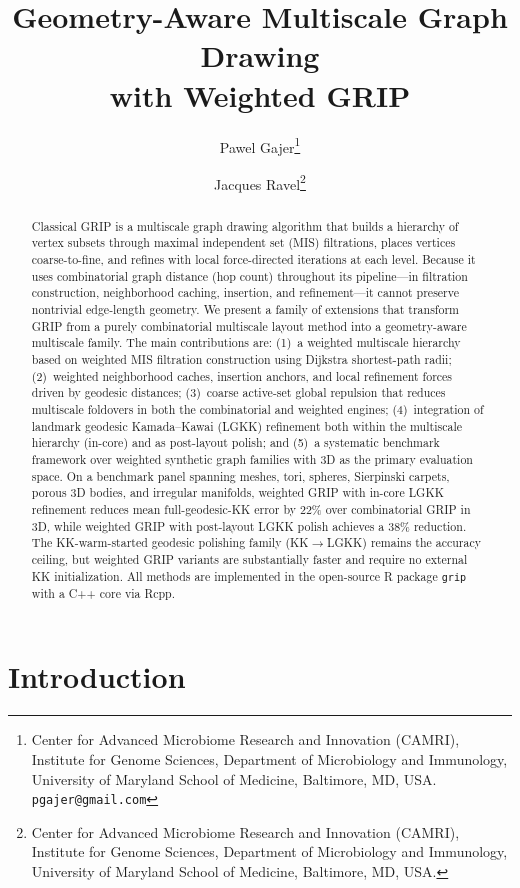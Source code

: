 \documentclass[11pt,twocolumn]{article}
\title{Geometry-Aware Multiscale Graph Drawing\\with Weighted GRIP}
\author{
  Pawel Gajer\thanks{Center for Advanced Microbiome Research and Innovation
  (CAMRI), Institute for Genome Sciences, Department of Microbiology and
  Immunology, University of Maryland School of Medicine, Baltimore, MD, USA.
  \texttt{pgajer@gmail.com}}
  \and
  Jacques Ravel\thanks{Center for Advanced Microbiome Research and Innovation
  (CAMRI), Institute for Genome Sciences, Department of Microbiology and
  Immunology, University of Maryland School of Medicine, Baltimore, MD, USA.}
}
\date{}
\newcommand{\grip}{\texttt{grip}}
\begin{document}
\maketitle

\begin{abstract}
Classical GRIP is a multiscale graph drawing algorithm that builds a
hierarchy of vertex subsets through maximal independent set (MIS)
filtrations, places vertices coarse-to-fine, and refines with local
force-directed iterations at each level.  Because it uses combinatorial
graph distance (hop count) throughout its pipeline---in filtration
construction, neighborhood caching, insertion, and refinement---it cannot
preserve nontrivial edge-length geometry.  We present a family of
extensions that transform GRIP from a purely combinatorial multiscale
layout method into a geometry-aware multiscale family.  The main
contributions are: (1)~a weighted multiscale hierarchy based on weighted
MIS filtration construction using Dijkstra shortest-path radii;
(2)~weighted neighborhood caches, insertion anchors, and local
refinement forces driven by geodesic distances; (3)~coarse active-set
global repulsion that reduces multiscale foldovers in both the
combinatorial and weighted engines; (4)~integration of landmark geodesic
Kamada--Kawai (LGKK) refinement both within the multiscale hierarchy
(in-core) and as post-layout polish; and (5)~a systematic benchmark
framework over weighted synthetic graph families with 3D as the primary
evaluation space.  On a benchmark panel spanning meshes, tori, spheres,
Sierpinski carpets, porous 3D bodies, and irregular manifolds, weighted
GRIP with in-core LGKK refinement reduces mean full-geodesic-KK error by
22\% over combinatorial GRIP in 3D, while weighted GRIP with post-layout
LGKK polish achieves a 38\% reduction.  The KK-warm-started geodesic
polishing family (KK$\to$LGKK) remains the accuracy ceiling, but
weighted GRIP variants are substantially faster and require no external
KK initialization.  All methods are implemented in the open-source R
package \grip{} with a C++ core via Rcpp.
\end{abstract}

\section{Introduction}\label{sec:intro}
\end{document}
